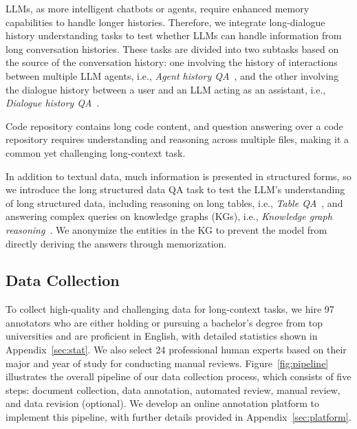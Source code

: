 LLMs, as more intelligent chatbots or agents, require enhanced memory capabilities to handle longer histories. Therefore, we integrate long-dialogue history understanding tasks to test whether LLMs can handle information from long conversation histories.
These tasks are divided into two subtasks based on the source of the conversation history: one involving the history of interactions between multiple LLM agents, i.e., \emph{Agent history QA}~\cite{huang2024far}, and the other involving the dialogue history between a user and an LLM acting as an assistant, i.e., \emph{Dialogue history QA}~\cite{wu2024longmemeval}.

Code repository contains long code content, and question answering over a code repository requires understanding and reasoning across multiple files, making it a common yet challenging long-context task.

In addition to textual data, much information is presented in structured forms, so we introduce the long structured data QA task to test the LLM's understanding of long structured data, including reasoning on long tables, i.e., \emph{Table QA}~\cite{zhang2024tablellm}, and answering complex queries on knowledge graphs (KGs), i.e., \emph{Knowledge graph reasoning}~\cite{cao2022kqa,bai2023answering}.
We anonymize the entities in the KG to prevent the model from directly deriving the answers through memorization.

\subsection{Data Collection}
\label{sec:data_collection}

To collect high-quality and challenging data for long-context tasks, we hire 97 annotators who are either holding or pursuing a bachelor's degree from top universities and are proficient in English, with detailed statistics shown in Appendix~\ref{sec:stat}. We also select 24 professional human experts based on their major and year of study for conducting manual reviews.
Figure~\ref{fig:pipeline} illustrates the overall pipeline of our data collection process, which consists of five steps: document collection, data annotation, automated review, manual review, and data revision (optional). 
We develop an online annotation platform to implement this pipeline, with further details provided in Appendix~\ref{sec:platform}.

